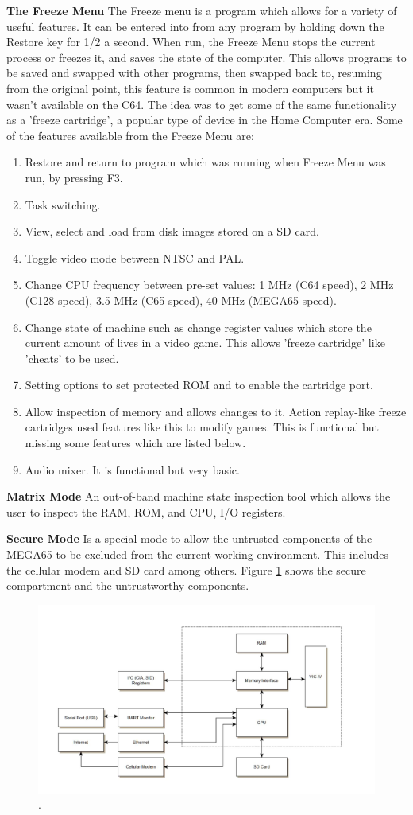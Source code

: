 \textbf{The Freeze Menu}
The Freeze menu is a program which allows for a variety of useful features. It can be entered into from any program by holding down the Restore key for 1/2 a second. When run, the Freeze Menu stops the current process or freezes it, and saves the state of the computer. This allows programs to be saved and swapped with other programs, then swapped back to, resuming from the original point, this feature is common in modern computers but it wasn't available on the C64. The idea was to get some of the same functionality as a 'freeze cartridge', a popular type of device in the Home Computer era. Some of the features available from the Freeze Menu are:
\begin{enumerate}
\item Restore and return to program which was running when Freeze Menu was run, by pressing F3.
\item Task switching.
\item View, select and load from disk images stored on a SD card.
\item Toggle video mode between NTSC and PAL.
\item Change CPU frequency between pre-set values: 1 MHz (C64 speed), 2 MHz (C128 speed), 3.5 MHz (C65 speed), 40 MHz (MEGA65 speed).
\item Change state of machine such as change register values which store the current amount of lives in a video game. This allows 'freeze cartridge' like 'cheats' to be used.
\item Setting options to set protected ROM and to enable the cartridge port.
\item Allow inspection of memory and allows changes to it. Action replay-like freeze cartridges used features like this to modify games. This is functional but missing some features which are listed below.
\item Audio mixer. It is functional but very basic.
\end{enumerate}

\textbf{Matrix Mode}
An out-of-band machine state inspection tool which allows the user to inspect the RAM, ROM, and CPU, I/O registers.

\textbf{Secure Mode}
Is a special mode to allow the untrusted components of the MEGA65 to be excluded from the current working environment. This includes the cellular modem and SD card among others. Figure \ref{secure_compartment} shows the secure compartment and the untrustworthy components.


\begin{figure} \begin{center}
\includegraphics[width=.3\linewidth]{pics/secure_compartment} 
\end{center} 
\caption{.\\}
\label{secure_compartment}
\end{figure}

